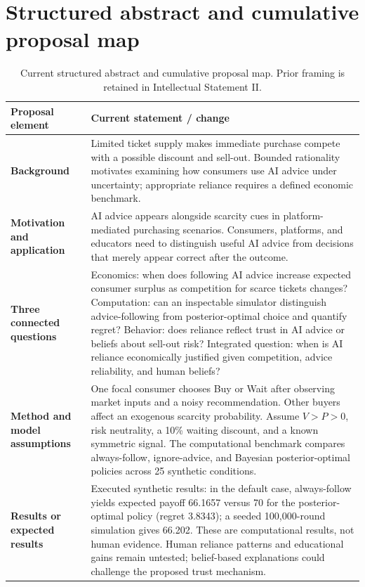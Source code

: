 \clearpage\onecolumn
\section{Structured abstract and cumulative proposal map}

\begin{table}[ht]
\caption{Current structured abstract and cumulative proposal map. Prior framing is retained in Intellectual Statement II.}
\label{tab:structured-abstract}
\begin{tabular}{p{} p{}}
\toprule
\textbf{Proposal element} & \textbf{Current statement / change} \\
\midrule

\textbf{Background}
&
Limited ticket supply makes immediate purchase compete with a possible discount and sell-out. Bounded rationality motivates examining how consumers use AI advice under uncertainty; appropriate reliance requires a defined economic benchmark.
\\

\textbf{Motivation and application}
&
AI advice appears alongside scarcity cues in platform-mediated purchasing scenarios. Consumers, platforms, and educators need to distinguish useful AI advice from decisions that merely appear correct after the outcome.
\\

\textbf{Three connected questions}
&
Economics: when does following AI advice increase expected consumer surplus as competition for scarce tickets changes? Computation: can an inspectable simulator distinguish advice-following from posterior-optimal choice and quantify regret? Behavior: does reliance reflect trust in AI advice or beliefs about sell-out risk? Integrated question: when is AI reliance economically justified given competition, advice reliability, and human beliefs?
\\

\textbf{Method and model assumptions}
&
One focal consumer chooses Buy or Wait after observing market inputs and a noisy recommendation. Other buyers affect an exogenous scarcity probability. Assume $V>P>0$, risk neutrality, a 10\% waiting discount, and a known symmetric signal. The computational benchmark compares always-follow, ignore-advice, and Bayesian posterior-optimal policies across 25 synthetic conditions.
\\

\textbf{Results or expected results}
&
Executed synthetic results: in the default case, always-follow yields expected payoff 66.1657 versus 70 for the posterior-optimal policy (regret 3.8343); a seeded 100,000-round simulation gives 66.202. These are computational results, not human evidence. Human reliance patterns and educational gains remain untested; belief-based explanations could challenge the proposed trust mechanism.
\\


\end{tabular}
\end{table}
